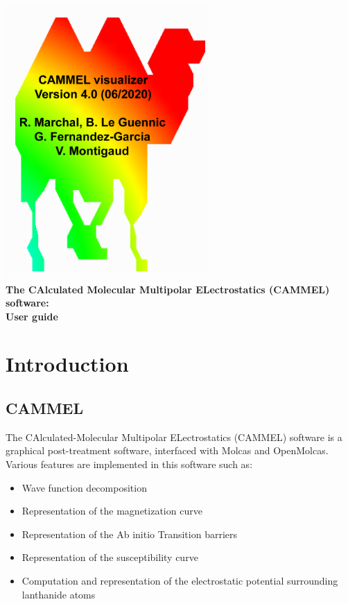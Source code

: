 \documentclass[12pt,a4paper]{article}
\begin{document}
\vspace*{\fill}
\begin{center}
\includegraphics[width=8cm]{cammel_color4.png}\\
\Huge \textbf{The CAlculated Molecular Multipolar ELectrostatics (CAMMEL) software:\\
User guide}
\end{center}
\vspace*{\fill}
\newpage

\tableofcontents

\newpage
\section{Introduction}
\subsection{CAMMEL}
The CAlculated-Molecular Multipolar ELectrostatics (CAMMEL) software is a graphical post-treatment software, interfaced with Molcas and OpenMolcas. Various features are implemented in this software such as:
\begin{itemize}
\item{Wave function decomposition}
\item{Representation of the magnetization curve}
\item{Representation of the Ab initio Transition barriers}
\item{Representation of the susceptibility curve}
\item{Computation and representation of the electrostatic potential surrounding lanthanide atoms}
\end{itemize}
\end{document}
